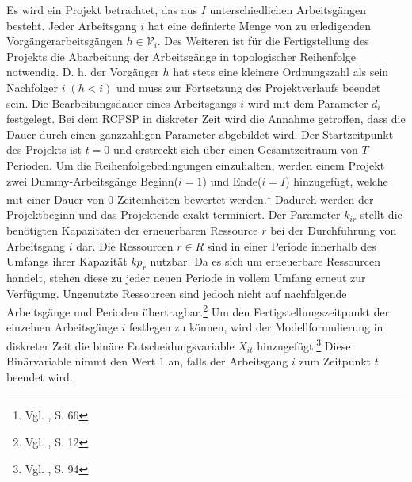 \documentclass[a4paper,12pt,parskip,bibtotoc,liststotoc]{article}
\begin{document}
Es wird ein Projekt betrachtet, das aus $I$ unterschiedlichen Arbeitsgängen besteht. Jeder Arbeitsgang $i$ hat eine definierte Menge von zu erledigenden Vorgängerarbeitsgängen $h \in \mathcal{V}_{i}$. Des Weiteren ist für die Fertigstellung des Projekts die Abarbeitung der Arbeitsgänge in topologischer Reihenfolge notwendig. D. h. der Vorgänger $h$ hat stets eine kleinere Ordnungszahl als sein Nachfolger $i\;(h<i)$ und muss zur Fortsetzung des Projektverlaufs beendet sein. Die Bearbeitungsdauer eines Arbeitsgangs $i$ wird mit dem Parameter $d_{i}$ festgelegt.  Bei dem RCPSP in diskreter Zeit wird die Annahme getroffen, dass die Dauer durch einen ganzzahligen Parameter abgebildet wird. Der Startzeitpunkt des Projekts ist $t = 0$ und erstreckt sich über einen Gesamtzeitraum von $T$ Perioden. Um die Reihenfolgebedingungen einzuhalten, werden einem Projekt zwei Dummy-Arbeitsgänge \glqq Beginn\grqq\;($i=1$) und \glqq Ende\grqq\;($i=I$) hinzugefügt, welche mit einer Dauer von $0$ Zeiteinheiten bewertet werden.\footnote{Vgl. \cite{zimmermann2006projektplanung}, S. 66} Dadurch werden der Projektbeginn und das Projektende exakt terminiert. Der Parameter $k_{ir}$ stellt die benötigten Kapazitäten der erneuerbaren Ressource $r$ bei der Durchführung von Arbeitsgang $i$ dar. Die Ressourcen $r \in R$ sind in einer Periode innerhalb des Umfangs ihrer Kapazität $kp_{r}$ nutzbar. Da es sich um erneuerbare Ressourcen handelt, stehen diese zu jeder neuen Periode in vollem Umfang erneut zur Verfügung. Ungenutzte Ressourcen sind jedoch nicht auf nachfolgende Arbeitsgänge und Perioden übertragbar.\footnote{Vgl. \cite{kellenbrink2014einfuhrung}, S. 12} Um den Fertigstellungszeitpunkt der einzelnen Arbeitsgänge $i$ festlegen zu können, wird der Modellformulierung in diskreter Zeit die binäre Entscheidungsvariable $X_{it}$ hinzugefügt.\footnote{Vgl. \cite{pritsker1969multiproject}, S. 94} Diese Binärvariable nimmt den Wert $1$ an, falls der Arbeitsgang $i$ zum Zeitpunkt $t$ beendet wird.\\
\end{document}
